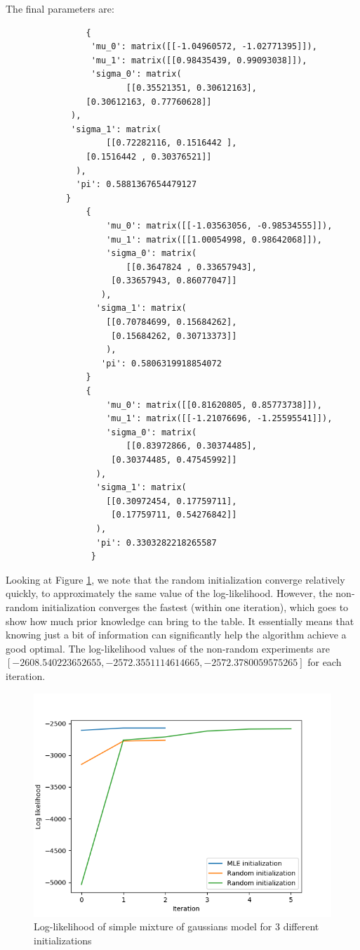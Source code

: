 \documentclass[12pt]{article}
\begin{document}
\begin{enumerate}[label=(\Alph*)]
\begin{enumerate}[label=(\roman*)]
		The final parameters are:
		\begin{verbatim}
				{
				 'mu_0': matrix([[-1.04960572, -1.02771395]]),
				 'mu_1': matrix([[0.98435439, 0.99093038]]),
				 'sigma_0': matrix(
				 		[[0.35521351, 0.30612163],
		        [0.30612163, 0.77760628]]
		     ),
		     'sigma_1': matrix(
		     		[[0.72282116, 0.1516442 ],
		        [0.1516442 , 0.30376521]]
		      ),
		      'pi': 0.5881367654479127
		    }
				{
					'mu_0': matrix([[-1.03563056, -0.98534555]]),
					'mu_1': matrix([[1.00054998, 0.98642068]]),
					'sigma_0': matrix(
						[[0.3647824 , 0.33657943],
				     [0.33657943, 0.86077047]]
				   ),
				  'sigma_1': matrix(
				   	[[0.70784699, 0.15684262],
				     [0.15684262, 0.30713373]]
				    ),
				   'pi': 0.5806319918854072
				}
				{
					'mu_0': matrix([[0.81620805, 0.85773738]]),
					'mu_1': matrix([[-1.21076696, -1.25595541]]),
					'sigma_0': matrix(
						[[0.83972866, 0.30374485],
				     [0.30374485, 0.47545992]]
				  ),
				  'sigma_1': matrix(
				  	[[0.30972454, 0.17759711],
				     [0.17759711, 0.54276842]]
				  ),
				  'pi': 0.3303282218265587
				 }
			\end{verbatim}

			Looking at Figure \ref{fig:2aii}, we note that the random initialization converge relatively quickly, to approximately the same value of the log-likelihood. However, the non-random initialization converges the fastest (within one iteration), which goes to show how much prior knowledge can bring to the table. It essentially means that knowing just a bit of information can significantly help the algorithm achieve a good optimal. The log-likelihood values of the non-random experiments are $[-2608.540223652655, -2572.3551114614665, -2572.3780059575265]$ for each iteration.

			\begin{figure}[h!]
				\centering
				\includegraphics{starter/2aii.png}
				\caption{Log-likelihood of simple mixture of gaussians model for 3 different initializations}
				\label{fig:2aii}
			\end{figure}


\end{enumerate}
\end{enumerate}
\end{document}
